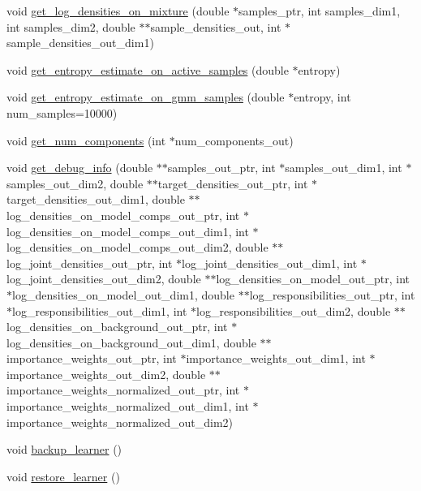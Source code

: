 \begin{DoxyCompactItemize}
\item 
void \hyperlink{classVIPS__PythonWrapper_a4cd577f2c0ae57ba85fff0746f7c7d7a}{get\+\_\+log\+\_\+densities\+\_\+on\+\_\+mixture} (double $\ast$samples\+\_\+ptr, int samples\+\_\+dim1, int samples\+\_\+dim2, double $\ast$$\ast$sample\+\_\+densities\+\_\+out, int $\ast$sample\+\_\+densities\+\_\+out\+\_\+dim1)
\item 
void \hyperlink{classVIPS__PythonWrapper_a2be7ce5aaa742d979b35ade922139894}{get\+\_\+entropy\+\_\+estimate\+\_\+on\+\_\+active\+\_\+samples} (double $\ast$entropy)
\item 
void \hyperlink{classVIPS__PythonWrapper_a8065f48c6060b03eaa2b5c7f1f89c636}{get\+\_\+entropy\+\_\+estimate\+\_\+on\+\_\+gmm\+\_\+samples} (double $\ast$entropy, int num\+\_\+samples=10000)
\item 
void \hyperlink{classVIPS__PythonWrapper_aeef466a77710252e595fcd6e9909f975}{get\+\_\+num\+\_\+components} (int $\ast$num\+\_\+components\+\_\+out)
\item 
void \hyperlink{classVIPS__PythonWrapper_af3f8d3af3549a8296eecc25a115c31f8}{get\+\_\+debug\+\_\+info} (double $\ast$$\ast$samples\+\_\+out\+\_\+ptr, int $\ast$samples\+\_\+out\+\_\+dim1, int $\ast$samples\+\_\+out\+\_\+dim2, double $\ast$$\ast$target\+\_\+densities\+\_\+out\+\_\+ptr, int $\ast$target\+\_\+densities\+\_\+out\+\_\+dim1, double $\ast$$\ast$log\+\_\+densities\+\_\+on\+\_\+model\+\_\+comps\+\_\+out\+\_\+ptr, int $\ast$log\+\_\+densities\+\_\+on\+\_\+model\+\_\+comps\+\_\+out\+\_\+dim1, int $\ast$log\+\_\+densities\+\_\+on\+\_\+model\+\_\+comps\+\_\+out\+\_\+dim2, double $\ast$$\ast$log\+\_\+joint\+\_\+densities\+\_\+out\+\_\+ptr, int $\ast$log\+\_\+joint\+\_\+densities\+\_\+out\+\_\+dim1, int $\ast$log\+\_\+joint\+\_\+densities\+\_\+out\+\_\+dim2, double $\ast$$\ast$log\+\_\+densities\+\_\+on\+\_\+model\+\_\+out\+\_\+ptr, int $\ast$log\+\_\+densities\+\_\+on\+\_\+model\+\_\+out\+\_\+dim1, double $\ast$$\ast$log\+\_\+responsibilities\+\_\+out\+\_\+ptr, int $\ast$log\+\_\+responsibilities\+\_\+out\+\_\+dim1, int $\ast$log\+\_\+responsibilities\+\_\+out\+\_\+dim2, double $\ast$$\ast$log\+\_\+densities\+\_\+on\+\_\+background\+\_\+out\+\_\+ptr, int $\ast$log\+\_\+densities\+\_\+on\+\_\+background\+\_\+out\+\_\+dim1, double $\ast$$\ast$importance\+\_\+weights\+\_\+out\+\_\+ptr, int $\ast$importance\+\_\+weights\+\_\+out\+\_\+dim1, int $\ast$importance\+\_\+weights\+\_\+out\+\_\+dim2, double $\ast$$\ast$importance\+\_\+weights\+\_\+normalized\+\_\+out\+\_\+ptr, int $\ast$importance\+\_\+weights\+\_\+normalized\+\_\+out\+\_\+dim1, int $\ast$importance\+\_\+weights\+\_\+normalized\+\_\+out\+\_\+dim2)
\item 
void \hyperlink{classVIPS__PythonWrapper_a007140eac0ea0ea69de16a7eb8c13293}{backup\+\_\+learner} ()
\item 
void \hyperlink{classVIPS__PythonWrapper_a3819321597ef3f522bd577f479ff81b0}{restore\+\_\+learner} ()
\end{DoxyCompactItemize}
